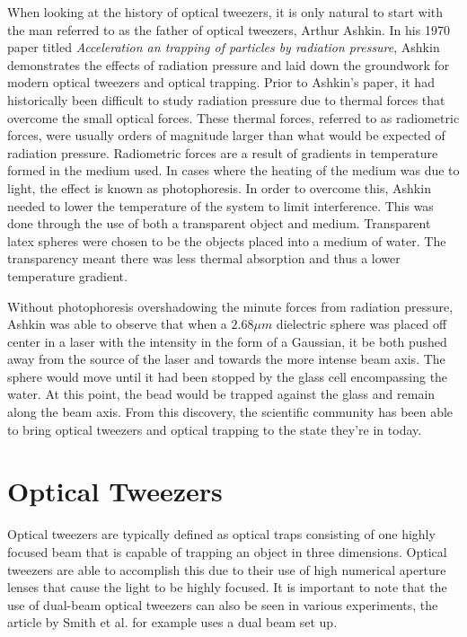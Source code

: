 \documentclass[%
 aip,
 amsmath,amssymb,
 reprint,%
]{revtex4-1}
\begin{document}
    When looking at the history of optical tweezers, it is only natural to start with the man referred to as the father of optical tweezers, Arthur Ashkin. In his 1970 paper titled \textit{Acceleration an trapping of particles by radiation pressure}, Ashkin demonstrates the effects of radiation pressure and laid down the groundwork for modern optical tweezers and optical trapping. Prior to Ashkin's paper, it had historically been difficult to study radiation pressure due to thermal forces that overcome the small optical forces. These thermal forces, referred to as radiometric forces, were usually orders of magnitude larger than what would be expected of radiation pressure. Radiometric forces are a result of gradients in temperature formed in the medium used. In cases where the heating of the medium was due to light, the effect is known as photophoresis\cite{ashkin}. In order to overcome this, Ashkin needed to lower the temperature of the system to limit interference. This was done through the use of both a transparent object and medium. Transparent latex spheres were chosen to be the objects placed into a medium of water. The transparency meant there was less thermal absorption and thus a lower temperature gradient. 
    
    Without photophoresis overshadowing the minute forces from radiation pressure, Ashkin was able to observe that when a $2.68 \mu m$ dielectric sphere was placed off center in a laser with the intensity in the form of a Gaussian, it be both pushed away from the source of the laser and towards the more intense beam axis\cite{ashkin}. The sphere would move until it had been stopped by the glass cell encompassing the water. At this point, the bead would be trapped against the glass and remain along the beam axis\cite{ashkin}. From this discovery, the scientific community has been able to bring optical tweezers and optical trapping to the state they're in today. 
    
\section{Optical Tweezers}
    Optical tweezers are typically defined as optical traps consisting of one highly focused beam that is capable of trapping an object in three dimensions. Optical tweezers are able to accomplish this due to their use of high numerical aperture lenses that cause the light to be highly focused. It is important to note that the use of dual-beam optical tweezers can also be seen in various experiments, the article by Smith et al.\cite{overstretching} for example uses a dual beam set up. 
\end{document}
